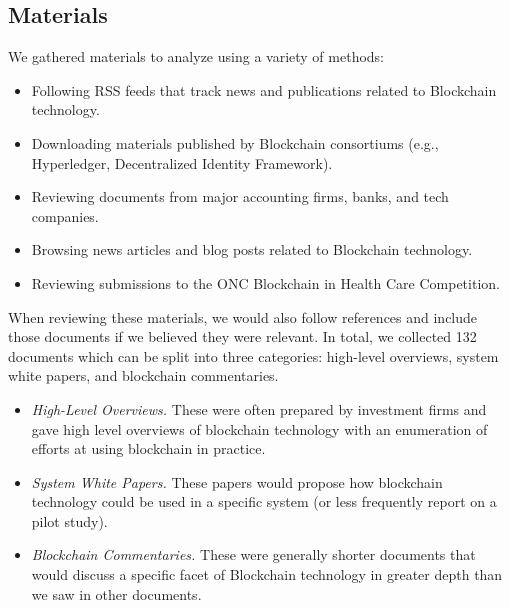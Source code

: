 \subsection{Materials}
We gathered materials to analyze using a variety of methods:

\begin{itemize}
	\item Following RSS feeds that track news and publications related to 
	Blockchain technology.%
	\item Downloading materials published by Blockchain consortiums (e.g., 
	Hyperledger, Decentralized Identity Framework).%
	\item Reviewing documents from major accounting firms, banks, and tech companies.
	\item Browsing news articles and blog posts related to Blockchain technology.%
	\item Reviewing submissions to the ONC Blockchain in Health Care Competition.
\end{itemize}

When reviewing these materials, we would also follow references and include those documents if we believed they were relevant. In total, we collected 132 documents which can be split into three categories: high-level overviews, system white papers, and blockchain commentaries.

\begin{itemize}
	\item \emph{High-Level Overviews.} These were often prepared by investment firms and gave high level overviews of blockchain technology with an enumeration of efforts at using blockchain in practice.
	\item \emph{System White Papers.} These papers would propose how blockchain technology could be used in a specific system (or less frequently report on a pilot study).
	\item \emph{Blockchain Commentaries.} These were generally shorter documents that would discuss a specific facet of Blockchain technology in greater depth than we saw in other documents.
\end{itemize}

